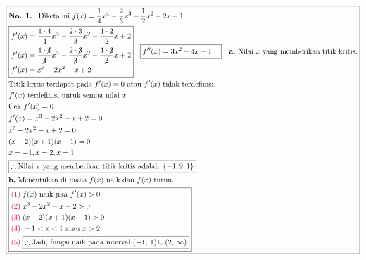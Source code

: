 \documentclass[13pt]{article}
\begin{document}
\par\noindent
\begin{fleqn}[4em]

\begin{align*}
\boxed{\begin{aligned}
  & \textbf{No. 1. } \text{ Diketahui }
    f(x) = \frac{1}{4} x^4 - \frac{2}{3} x^3 - \frac{1}{2} x^2 + 2x - 1 \\
  & \boxed{\begin{aligned}
    & f'(x) = \frac{1 \cdot 4}{4} x^3 - \frac{2 \cdot 3}{3} x^2 - \frac{1 \cdot 2}{2} x + 2 \\
    & f'(x) = \frac{1 \cdot \cancel{4}}{\cancel{4}} x^3 - \frac{2 \cdot \cancel{3}}{\cancel{3}} x^2 - \frac{1 \cdot \cancel{2}}{\cancel{2}} x + 2 \\
    & f'(x) = x^3 - 2x^2 - x + 2 \\
  \end{aligned}}\;~\;
  \boxed{\begin{aligned}[t]
    & f''(x) = 3x^2 - 4x - 1
  \end{aligned}}
  & \textbf{a.} \text{ Nilai } x \text{ yang memberikan titik kritis.} \\
  & \text{Titik kritis terdapat pada } f'(x) = 0 \text{ atau } f'(x) \text{ tidak terdefinisi.} \\
  & f'(x) \text{ terdefinisi untuk semua nilai } x \\
  & \text{Cek } f'(x) = 0 \\
  & f'(x) = x^3 - 2x^2 - x + 2 = 0 \\
  & x^3 - 2x^2 - x + 2 = 0 \\
  & (x - 2)(x + 1)(x - 1) = 0 \\
  & x = -1, x = 2, x = 1 \\
  & \boxed{\therefore \text{Nilai } x \text{ yang memberikan titik kritis adalah } \left\{-1, 2, 1\right\}} \\
  & \textbf{b.} \text{ Menentukan di mana } f(x) \text{ naik dan } f(x) \text{ turun.} \\
  & \boxed{\begin{aligned}
    & {\color{purple}(1)}\; f(x) \text{ naik jika } f'(x) > 0 \\
    & {\color{purple}(2)}\; x^3 - 2x^2 - x + 2 > 0 \\
    & {\color{purple}(3)}\; (x - 2)(x + 1)(x - 1) > 0 \\
    & {\color{purple}(4)}\; -1<x<1\text{ atau }x>2 \\
    & {\color{purple}(5)}\; \boxed{
      \therefore \text{Jadi, fungsi naik pada interval } (-1,\:1)\cup (2,\:\infty)
}
\end{aligned}}
\end{aligned}}
\end{align*}
\end{fleqn}
\end{document}
